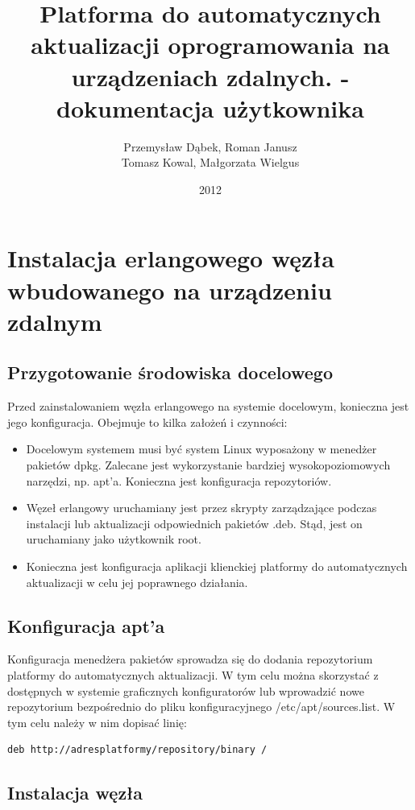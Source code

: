 \documentclass[polish,12pt]{aghthesis}
\author{Przemysław Dąbek, Roman Janusz\\ Tomasz Kowal, Małgorzata Wielgus}
\title{Platforma do automatycznych aktualizacji oprogramowania na urządzeniach zdalnych. - dokumentacja użytkownika}
\date{2012}
\begin{document}
\maketitle

\section{Instalacja erlangowego węzła wbudowanego na urządzeniu zdalnym}

\subsection{Przygotowanie środowiska docelowego}

Przed zainstalowaniem węzła erlangowego na systemie docelowym, konieczna jest jego konfiguracja. Obejmuje to kilka założeń i czynności:
\begin{itemize}
\item Docelowym systemem musi być system Linux wyposażony w menedżer pakietów dpkg. Zalecane jest wykorzystanie bardziej wysokopoziomowych narzędzi, np. apt'a. Konieczna jest konfiguracja repozytoriów.
\item Węzeł erlangowy uruchamiany jest przez skrypty zarządzające podczas instalacji lub aktualizacji odpowiednich pakietów .deb. Stąd, jest on uruchamiany jako użytkownik root.
\item Konieczna jest konfiguracja aplikacji klienckiej platformy do automatycznych aktualizacji w celu jej poprawnego działania.
\end{itemize}

\subsection{Konfiguracja apt'a}

Konfiguracja menedżera pakietów sprowadza się do dodania repozytorium platformy do automatycznych aktualizacji. W tym celu można skorzystać z dostępnych w systemie graficznych konfiguratorów lub wprowadzić nowe repozytorium bezpośrednio do pliku konfiguracyjnego /etc/apt/sources.list. W tym celu należy w nim dopisać linię:

\begin{verbatim}
deb http://adresplatformy/repository/binary /
\end{verbatim}

\subsection{Instalacja węzła}
\end{document}
